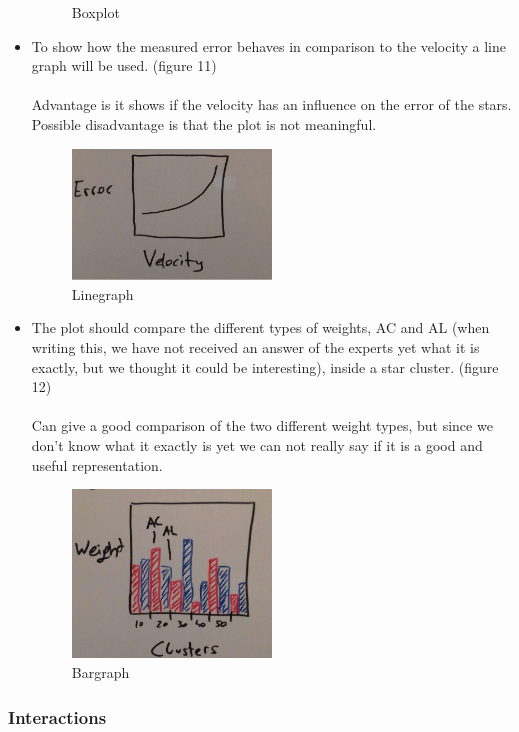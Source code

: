 \documentclass{article}
\begin{document}
\begin{itemize}
\begin{figure}[!h]
	\caption{Boxplot }
	\label{fig10}
\end{figure}
\item To show how the measured error behaves in comparison to the velocity a line graph will be used. (figure 11)\\
\\
Advantage is it shows if the velocity has an influence on the error of the stars. Possible disadvantage is that the plot is not meaningful.
\begin{figure}[!h]
\centering
\includegraphics[width=0.5\textwidth]{images/VelocityError.jpg}
	\caption{Linegraph  }
	\label{fig11}
\end{figure}
\newpage\item The plot should compare the different types of weights, AC and AL (when writing this, we have not received an answer of the experts yet what it is exactly, but we thought it could be interesting), inside a star cluster. (figure 12)\\
\\
Can give a good comparison of the two different weight types, but since we don't know what it exactly is yet we can not really say if it is a good and useful representation.
\begin{figure}[!h]
\centering
\includegraphics[width=0.5\textwidth]{images/ClustersWeight.jpg}
	\caption{Bargraph  }
	\label{fig12}
\end{figure}
\end{itemize}
\newpage\subsubsection{Interactions}
\end{document}
